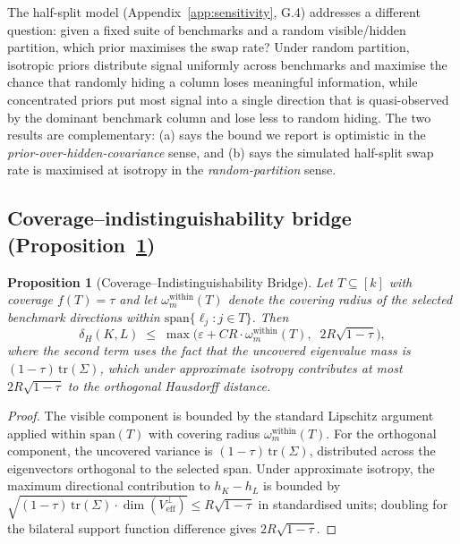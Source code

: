 \documentclass{article}
\newtheorem{proposition}{Proposition}
\begin{document}
\noindent The half-split model (Appendix~\ref{app:sensitivity}, G.4)
addresses a different question: given a fixed suite of benchmarks and
a random visible/hidden partition, which prior maximises the swap
rate? Under random partition, isotropic priors distribute signal
uniformly across benchmarks and maximise the chance that randomly
hiding a column loses meaningful information, while concentrated
priors put most signal into a single direction that is quasi-observed
by the dominant benchmark column and lose less to random hiding. The
two results are complementary: (a) says the bound we report is
optimistic in the \emph{prior-over-hidden-covariance} sense, and (b)
says the simulated half-split swap rate is maximised at isotropy in
the \emph{random-partition} sense.

\subsection*{Coverage--indistinguishability bridge (Proposition~\ref{prop:body:bridge})}

\begin{proposition}[Coverage--Indistinguishability Bridge]
\label{prop:body:bridge}
Let $T \subseteq [k]$ with coverage $f(T) = \tau$ and let
$\omega_m^{\mathrm{within}}(T)$ denote the covering radius of the
selected benchmark directions within $\mathrm{span}\{\ell_j : j \in
T\}$. Then
\[
  \delta_H(K, L)
  \;\le\;
  \max\!\Big(
     \varepsilon + C R \cdot \omega_m^{\mathrm{within}}(T),\;\;
     2 R \sqrt{1 - \tau}
  \Big),
\]
where the second term uses the fact that the uncovered eigenvalue
mass is $(1-\tau)\,\mathrm{tr}(\Sigma)$, which under approximate
isotropy contributes at most $2R\sqrt{1-\tau}$ to the orthogonal
Hausdorff distance.
\end{proposition}

\begin{proof}
The visible component is bounded by the standard Lipschitz argument
applied within $\mathrm{span}(T)$ with covering radius
$\omega_m^{\mathrm{within}}(T)$. For the orthogonal component, the
uncovered variance is $(1 - \tau)\,\mathrm{tr}(\Sigma)$, distributed
across the eigenvectors orthogonal to the selected span. Under
approximate isotropy, the maximum directional contribution to
$h_K - h_L$ is bounded by
$\sqrt{(1 - \tau)\,\mathrm{tr}(\Sigma) \cdot \dim(V_{\mathrm{eff}}^\perp)} \le
R\sqrt{1 - \tau}$ in standardised units; doubling for the bilateral
support function difference gives $2R\sqrt{1 - \tau}$.
\end{proof}
\end{document}
